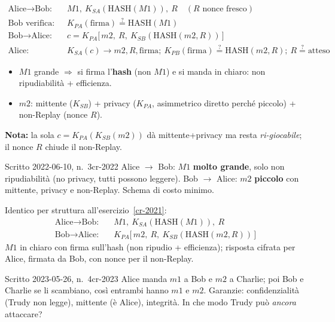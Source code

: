 \documentclass{report}
\newcommand{\Ks}[1]{K_{S#1}}   %
\newcommand{\Kp}[1]{K_{P#1}}   %
\newcommand{\HASH}{\text{HASH}}
\begin{document}
\begin{solution}
\begin{align*}
\text{Alice}\to\text{Bob:}\quad & M1,\ \Ks{A}(\HASH(M1)),\ R \quad(\text{$R$ nonce fresco})\\
\text{Bob verifica:}\quad & \Kp{A}(\text{firma})\overset{?}{=}\HASH(M1)\\
\text{Bob}\to\text{Alice:}\quad & c=\Kp{A}\big[\,m2,\ R,\ \Ks{B}(\HASH(m2,R))\,\big]\\
\text{Alice:}\quad & \Ks{A}(c)\to m2,R,\text{firma};\ \Kp{B}(\text{firma})\overset{?}{=}\HASH(m2,R);\ R\overset{?}{=}\text{atteso}
\end{align*}
\begin{itemize}
\item $M1$ grande $\Rightarrow$ si firma l'\textbf{hash} (non $M1$) e si manda in
chiaro: non ripudiabilità + efficienza.
\item $m2$: mittente ($\Ks{B}$) + privacy ($\Kp{A}$, asimmetrico diretto perché
piccolo) + non-Replay (nonce $R$).
\end{itemize}
\textbf{Nota:} la sola $c=\Kp{A}(\Ks{B}(m2))$ dà mittente+privacy ma resta
\emph{ri-giocabile}; il nonce $R$ chiude il non-Replay.
\end{solution}

\begin{Exercise}{Scritto 2022-06-10, n.\ 3}{cr-2022}
Alice $\to$ Bob: $M1$ \textbf{molto grande}, solo non ripudiabilità (no privacy,
tutti possono leggere). Bob $\to$ Alice: $m2$ \textbf{piccolo} con mittente,
privacy e non-Replay. Schema di costo minimo.
\end{Exercise}

\begin{solution}
Identico per struttura all'esercizio~\ref{cr-2021}:
\begin{align*}
\text{Alice}\to\text{Bob:}\quad & M1,\ \Ks{A}(\HASH(M1)),\ R\\
\text{Bob}\to\text{Alice:}\quad & \Kp{A}\big[\,m2,\ R,\ \Ks{B}(\HASH(m2,R))\,\big]
\end{align*}
$M1$ in chiaro con firma sull'hash (non ripudio + efficienza); risposta cifrata
per Alice, firmata da Bob, con nonce per il non-Replay.
\end{solution}

\begin{Exercise}{Scritto 2023-05-26, n.\ 4}{cr-2023}
Alice manda $m1$ a Bob e $m2$ a Charlie; poi Bob e Charlie se li scambiano, così
entrambi hanno $m1$ e $m2$. Garanzie: confidenzialità (Trudy non legge),
mittente (è Alice), integrità. In che modo Trudy può \emph{ancora} attaccare?
\end{Exercise}
\end{document}

